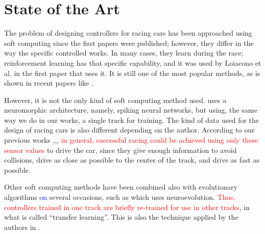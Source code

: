 \documentclass[10pt,journal,compsoc]{IEEEtran}
\begin{document}
\section{State of the Art}
\label{sec:soa}



The problem of designing controllers for racing cars has been
approached using soft computing since the first papers were
published; however, they differ in the way the specific controlled
works. In many cases, they learn during the race; reinforcement
learning has that specific capability, and it was used by Loiacono et
al. \cite{loiacono2010learning} in the first paper that uses it. It is still one of the most popular methods, as is shown in recent papers like \cite{remondaformula,waghdistributed}.

However, it is not the only kind of soft computing method
used. \cite{mirus2019short} uses a neuromorphic architecture, namely,
spiking neural networks, but using, the same way we do in our works, a single track for training. The kind of data used for the design of racing cars is
also different depending on the author. 
According to our previous works \cite{salem_evo17},\cite{salem_evo18},\cite{salem_cig2018}, \textcolor{red}{ in general, successful racing could be achieved using only these sensor values }to drive the car, since they give enough information to avoid collisions, drive as close as possible to the center of the track, and drive as fast as possible.

Other soft computing methods have been combined also with evolutionary algorithms \textcolor{blue}{on} several occasions, such as \cite{10.1371/journal.pone.0213193} which uses neuroevolution. \textcolor{red}{Thus, controllers trained in one track are briefly re-trained for use in other tracks}, in what is called ``transfer learning''. This is also the technique applied by the authors in \cite{verma2018programmatically}. 


\end{document}
